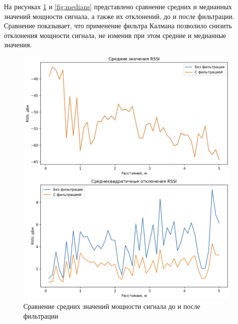 На рисунках \ref{fig:means} и \ref{fig:medians} представлено сравнение средних и медианных значений мощности сигнала, а также их отклонений,  до и после фильтрации. Сравнение показывает, что применение фильтра Калмана позволило снизить отклонения мощности сигнала, не изменив при этом средние и медианные значения.

\begin{figure}[H]
	\centering
	\includegraphics[width=\textwidth]{assets/means.png}
	\caption{Сравнение средних значений мощности сигнала до и после фильтрации}
	\label{fig:means}
\end{figure}

